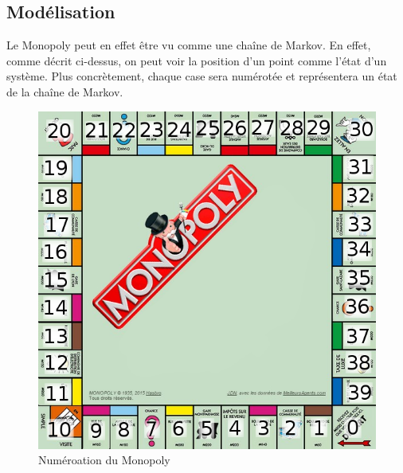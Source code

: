 \documentclass[letterpaper]{article}
\begin{document}
  \subsection{Modélisation}
    Le Monopoly peut en effet être vu comme une chaîne de Markov.  En effet, comme décrit
    ci-dessus, on peut voir la position d'un point comme l'état d'un système.  Plus 
    concrètement, chaque case sera numérotée et représentera un état de la chaîne de Markov.
    \begin{figure}[h]
      \centering
      \includegraphics[scale=0.4]{./Images/Monopoly.png}
	\caption{Numéroation du Monopoly \citep{IMG_Monopoly}}
    \end{figure}
    
\end{document}
